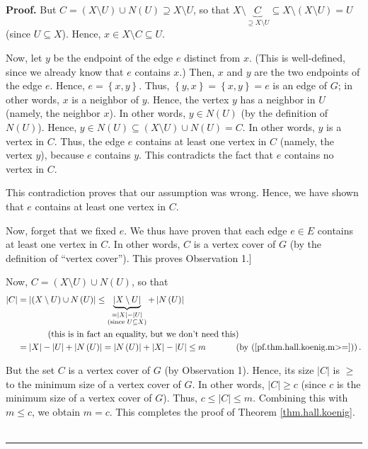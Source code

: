 \documentclass[numbers=enddot,12pt,final,onecolumn,notitlepage]{scrartcl}%
\theoremstyle{definition}
\newenvironment{proof}[1][Proof]{\noindent\textbf{#1.} }{\ \rule{0.5em}{0.5em}}
\begin{document}
\begin{proof}
But $C=\left(  X\setminus U\right)  \cup N\left(  U\right)  \supseteq
X\setminus U$, so that $X\setminus\underbrace{C}_{\supseteq X\setminus
U}\subseteq X\setminus\left(  X\setminus U\right)  =U$ (since $U\subseteq X$).
Hence, $x\in X\setminus C\subseteq U$.

Now, let $y$ be the endpoint of the edge $e$ distinct from $x$. (This is
well-defined, since we already know that $e$ contains $x$.) Then, $x$ and $y$
are the two endpoints of the edge $e$. Hence, $e=\left\{  x,y\right\}  $.
Thus, $\left\{  y,x\right\}  =\left\{  x,y\right\}  =e$ is an edge of $G$; in
other words, $x$ is a neighbor of $y$. Hence, the vertex $y$ has a neighbor in
$U$ (namely, the neighbor $x$). In other words, $y\in N\left(  U\right)  $ (by
the definition of $N\left(  U\right)  $). Hence, $y\in N\left(  U\right)
\subseteq\left(  X\setminus U\right)  \cup N\left(  U\right)  =C$. In other
words, $y$ is a vertex in $C$. Thus, the edge $e$ contains at least one vertex
in $C$ (namely, the vertex $y$), because $e$ contains $y$. This contradicts
the fact that $e$ contains no vertex in $C$.

This contradiction proves that our assumption was wrong. Hence, we have shown
that $e$ contains at least one vertex in $C$.

Now, forget that we fixed $e$. We thus have proven that each edge $e\in E$
contains at least one vertex in $C$. In other words, $C$ is a vertex cover of
$G$ (by the definition of \textquotedblleft vertex cover\textquotedblright).
This proves Observation 1.]

Now, $C=\left(  X\setminus U\right)  \cup N\left(  U\right)  $, so that
\begin{align*}
\left\vert C\right\vert  &  =\left\vert \left(  X\setminus U\right)  \cup
N\left(  U\right)  \right\vert \leq\underbrace{\left\vert X\setminus
U\right\vert }_{\substack{=\left\vert X\right\vert -\left\vert U\right\vert
\\\text{(since }U\subseteq X\text{)}}}+\left\vert N\left(  U\right)
\right\vert \\
&  \ \ \ \ \ \ \ \ \ \ \left(  \text{this is in fact an equality, but we don't
need this}\right) \\
&  =\left\vert X\right\vert -\left\vert U\right\vert +\left\vert N\left(
U\right)  \right\vert =\left\vert N\left(  U\right)  \right\vert +\left\vert
X\right\vert -\left\vert U\right\vert \leq m\ \ \ \ \ \ \ \ \ \ \left(
\text{by (\ref{pf.thm.hall.koenig.m>=})}\right)  .
\end{align*}


But the set $C$ is a vertex cover of $G$ (by Observation 1). Hence, its size
$\left\vert C\right\vert $ is $\geq$ to the minimum size of a vertex cover of
$G$. In other words, $\left\vert C\right\vert \geq c$ (since $c$ is the
minimum size of a vertex cover of $G$). Thus, $c\leq\left\vert C\right\vert
\leq m$. Combining this with $m\leq c$, we obtain $m=c$. This completes the
proof of Theorem \ref{thm.hall.koenig}.
\end{proof}
\end{document}
